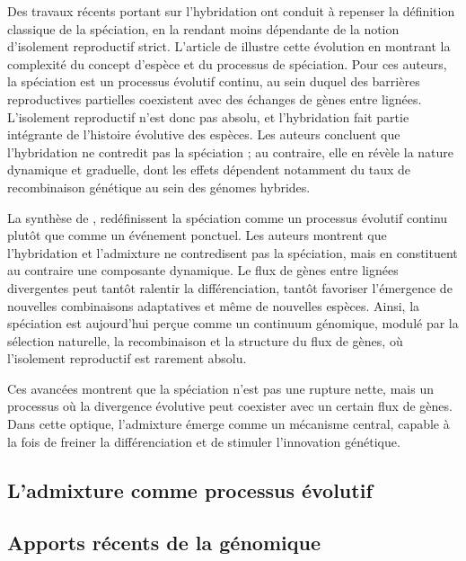 \documentclass[12pt,a4paper]{article}
\begin{document}
Des travaux récents portant sur l’hybridation ont conduit à repenser la définition classique de la spéciation, en la rendant moins dépendante de la notion d’isolement reproductif strict. L’article de \textcite{schumer2018natural} illustre cette évolution en montrant la complexité du concept d’espèce et du processus de spéciation. Pour ces auteurs, la spéciation est un processus évolutif continu, au sein duquel des barrières reproductives partielles coexistent avec des échanges de gènes entre lignées.
L’isolement reproductif n’est donc pas absolu, et l’hybridation fait partie intégrante de l’histoire évolutive des espèces. Les auteurs concluent que l’hybridation ne contredit pas la spéciation ; au contraire, elle en révèle la nature dynamique et graduelle, dont les effets dépendent notamment du taux de recombinaison génétique au sein des génomes hybrides.

La synthèse de \textcite{Penalbaetal2024_HybridizationReview}, redéfinissent la spéciation comme un processus évolutif continu plutôt que comme un événement ponctuel. Les auteurs montrent que l’hybridation et l’admixture ne contredisent pas la spéciation, mais en constituent au contraire une composante dynamique. Le flux de gènes entre lignées divergentes peut tantôt ralentir la différenciation, tantôt favoriser l’émergence de nouvelles combinaisons adaptatives et même de nouvelles espèces. Ainsi, la spéciation est aujourd’hui perçue comme un continuum génomique, modulé par la sélection naturelle, la recombinaison et la structure du flux de gènes, où l’isolement reproductif est rarement absolu.

Ces avancées montrent que la spéciation n’est pas une rupture nette, mais un processus où la divergence évolutive peut coexister avec un certain flux de gènes.
Dans cette optique, l’admixture émerge comme un mécanisme central, capable à la fois de freiner la différenciation et de stimuler l’innovation génétique.
\subsection{L’admixture comme processus évolutif}
\subsection{Apports récents de la génomique}
\end{document}
